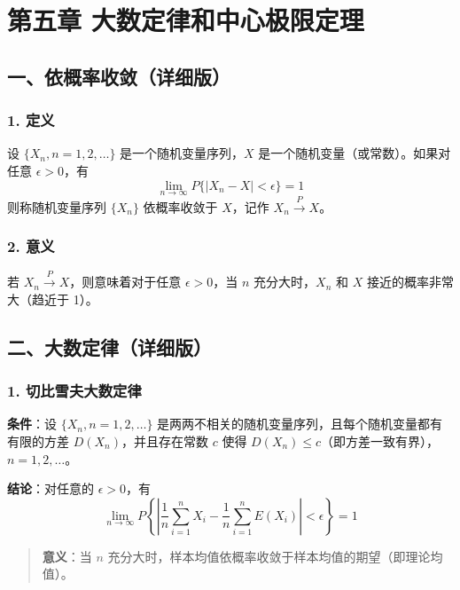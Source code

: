\documentclass[12pt,a4paper]{ctexart}
\newenvironment{myquote}
  {\par\vspace{0.5em}\begin{quote}\sffamily\color{gray}}
  {\end{quote}\vspace{0.5em}}
\begin{document}
\newpage
\section{第五章 大数定律和中心极限定理}

\subsection{一、依概率收敛（详细版）}

\subsubsection{1. 定义}
设 $\{X_n, n = 1, 2, \dots\}$ 是一个随机变量序列，$X$ 是一个随机变量（或常数）。如果对任意 $\epsilon > 0$，有
\[
    \lim_{n \to \infty} P\{|X_n - X| < \epsilon\} = 1
\]
则称随机变量序列 $\{X_n\}$ 依概率收敛于 $X$，记作 $X_n \xrightarrow{P} X$。

\subsubsection{2. 意义}
若 $X_n \xrightarrow{P} X$，则意味着对于任意 $\epsilon > 0$，当 $n$ 充分大时，$X_n$ 和 $X$ 接近的概率非常大（趋近于 1）。

\subsection{二、大数定律（详细版）}

\subsubsection{1. 切比雪夫大数定律}
\textbf{条件}：设 $\{X_n, n = 1, 2, \dots\}$ 是两两不相关的随机变量序列，且每个随机变量都有有限的方差 $D(X_n)$，并且存在常数 $c$ 使得 $D(X_n) \le c$（即方差一致有界），$n = 1, 2, \dots$。

\textbf{结论}：对任意的 $\epsilon > 0$，有
\[
    \lim_{n \to \infty} P\left\{\left|\frac{1}{n} \sum_{i=1}^n X_i - \frac{1}{n} \sum_{i=1}^n E(X_i)\right| < \epsilon\right\} = 1
\]

\begin{myquote}
    \textbf{意义}：当 $n$ 充分大时，样本均值依概率收敛于样本均值的期望（即理论均值）。
\end{myquote}
\end{document}

